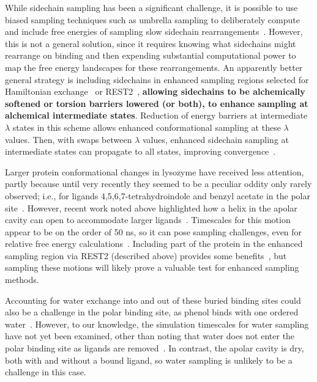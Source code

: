 \documentclass[aps,pre,twocolumn,nofootinbib,superscriptaddress,10pt, final,tightenlines]{revtex4-1}
\begin{document}
While sidechain sampling has been a significant challenge, it is possible to use biased sampling techniques such as umbrella sampling to deliberately compute and include free energies of sampling slow sidechain rearrangements~\cite{mobley_confine_2007}. 
However, this is not a general solution, since it requires knowing what sidechains might rearrange on binding and then expending substantial computational power to map the free energy landscapes for these rearrangements. 
An apparently better general strategy is including sidechains in enhanced sampling regions selected for Hamiltonian exchange~\cite{jiang_free_2010, khavrutskii_improved_2011} or REST2~\cite{wang_achieving_2012}, {\bf allowing sidechains to be alchemically softened or torsion barriers lowered (or both), to enhance sampling at alchemical intermediate states}.
Reduction of energy barriers at intermediate $\lambda$ states in this scheme allows enhanced conformational sampling at these $\lambda$ values. 
Then, with swaps between $\lambda$ values, enhanced sidechain sampling at intermediate states can propagate to all states, improving convergence~\cite{jiang_free_2010, wang_achieving_2012}.

Larger protein conformational changes in lysozyme have received less attention, partly because until very recently they seemed to be a peculiar oddity only rarely observed; i.e., for ligands 4,5,6,7-tetrahydroindole and benzyl acetate in the polar site~\cite{boyce_predicting_2009}. 
However, recent work noted above highlighted how a helix in the apolar cavity can open to accommodate larger ligands~\cite{merski_homologous_2015}. 
Timescales for this motion appear to be on the order of 50 ns, so it can pose sampling challenges, even for relative free energy calculations~\cite{lim_sensitivity_2016}. 
Including part of the protein in the enhanced sampling region via REST2 (described above) provides some benefits~\cite{lim_sensitivity_2016}, but sampling these motions will likely prove a valuable test for enhanced sampling methods.

Accounting for water exchange into and out of these buried binding sites could also be a challenge in the polar binding site, as phenol binds with one ordered water~\cite{wei_model_2002}. However, to our knowledge, the simulation timescales for water sampling have not yet been examined, other than noting that water does not enter the polar binding site as ligands are removed~\cite{boyce_predicting_2009}. 
In contrast, the apolar cavity is dry, both with and without a bound ligand, so water sampling is unlikely to be a challenge in this case.
\end{document}
